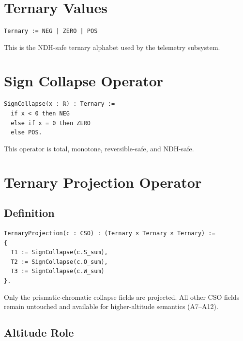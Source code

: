 \documentclass[11pt]{article}
\begin{document}
\section{Ternary Values}

\begin{verbatim}
Ternary := NEG | ZERO | POS
\end{verbatim}

This is the NDH-safe ternary alphabet used by the telemetry subsystem.

\newpage


\section{Sign Collapse Operator}

\begin{verbatim}
SignCollapse(x : ℝ) : Ternary :=
  if x < 0 then NEG
  else if x = 0 then ZERO
  else POS.
\end{verbatim}

This operator is total, monotone, reversible-safe, and NDH-safe.

\newpage


\section{Ternary Projection Operator}

\subsection{Definition}

\begin{verbatim}
TernaryProjection(c : CSO) : (Ternary × Ternary × Ternary) :=
{
  T1 := SignCollapse(c.S_sum),
  T2 := SignCollapse(c.O_sum),
  T3 := SignCollapse(c.W_sum)
}.
\end{verbatim}

Only the prismatic-chromatic collapse fields are projected.  
All other CSO fields remain untouched and available for higher-altitude
semantics (A7–A12).

\subsection{Altitude Role}
\end{document}
